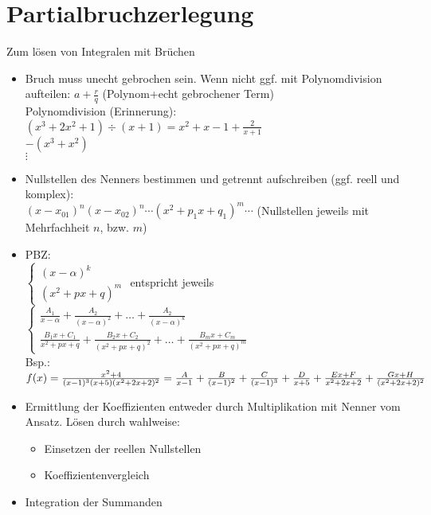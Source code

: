 \documentclass{scrreprt}
\begin{document}
\section{Partialbruchzerlegung}
Zum lösen von Integralen mit Brüchen
\begin{itemize}
\item Bruch muss unecht gebrochen sein. Wenn nicht ggf. mit Polynomdivision aufteilen: $a+\frac{r}{q}$ (Polynom+echt gebrochener Term)\\
Polynomdivision (Erinnerung):\\
$(x^3+2x^2+1)\div (x+1)=x^2+x-1+\frac{2}{x+1}$\\
$-(x^3+x^2)$\\
$\vdots$
\item Nullstellen des Nenners bestimmen und getrennt aufschreiben (ggf. reell und komplex): \\
$(x-x_{01})^n(x-x_{02})^n\cdots (x^2+p_1x+q_1)^m \cdots$ (Nullstellen jeweils mit Mehrfachheit $n$, bzw. $m$)
\item PBZ:\\
$\begin{cases}
(x-\alpha)^k\\
(x^2+px+q)^m
\end{cases}$ entspricht jeweils
$\begin{cases}
\frac{A_1}{x-\alpha}+\frac{A_2}{(x-\alpha)^2}+\dots + \frac{A_2}{(x-\alpha)^k}\\
\frac{B_1x+C_1}{x^2+px+q}+\frac{B_2 x + C_2}{(x^2+px+q)^2}+\dots + \frac{B_m x + C_m}{(x^2+px+q)^m}
\end{cases}$\\
Bsp.: $f(x) = \frac{x^2+4}{(x-1)^3(x+5)(x^2+2x+2)^2}\\
=\frac{A}{x-1}+\frac{B}{(x-1)^2}+\frac{C}{(x-1)^3}+ \frac{D}{x+5}+ \frac{Ex+F}{x^2+2x+2}+\frac{Gx+H}{(x^2+2x+2)^2}$
\item Ermittlung der Koeffizienten entweder durch Multiplikation mit Nenner vom Ansatz. Lösen durch wahlweise:
\begin{itemize}
\item Einsetzen der reellen Nullstellen
\item Koeffizientenvergleich
\end{itemize}
\item Integration der Summanden
\end{itemize}
\end{document}
